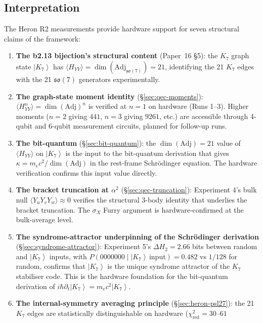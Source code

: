 \documentclass[11pt]{article}
\newcommand{\so}{\mathfrak{so}}
\newcommand{\Adj}{\mathrm{Adj}}
\newcommand{\ket}[1]{\left|#1\right\rangle}
\begin{document}
\subsection{Interpretation}
\label{sec:heron-interpretation}

The Heron R2 measurements provide hardware support for seven
structural claims of the framework:

\begin{enumerate}
\item \textbf{The b2.13 bijection's structural content}
  (Paper~16 \S5):  the $K_7$ graph state $\ket{K_7}$ has
  $\langle H_{YY}\rangle = \dim(\Adj_{\so(7)}) = 21$, identifying
  the 21 $K_7$ edges with the 21 $\so(7)$ generators experimentally.
\item \textbf{The graph-state moment identity}
  (\S\ref{sec:qec-moments}):  $\langle H_{YY}^n\rangle = \dim(\Adj)^n$
  is verified at $n=1$ on hardware (Runs 1--3).  Higher moments
  ($n=2$ giving $441$, $n=3$ giving $9261$, etc.) are accessible
  through 4-qubit and 6-qubit measurement circuits, planned for
  follow-up runs.
\item \textbf{The bit-quantum} (\S\ref{sec:bit-quantum}):  the
  $\dim(\Adj) = 21$ value of $\langle H_{YY}\rangle$ on $\ket{K_7}$
  is the input to the bit-quantum derivation that gives
  $\kappa = m_e c^2/\dim(\Adj)$ in the rest-frame Schr\"odinger
  equation.  The hardware verification confirms this input value
  directly.
\item \textbf{The bracket truncation at $\alpha^2$}
  (\S\ref{sec:qec-truncation}):  Experiment 4's bulk null
  $\langle Y_uY_vY_w\rangle \approx 0$ verifies the structural
  3-body identity that underlies the bracket truncation.  The
  $\sigma_X$ Furry argument is hardware-confirmed at the
  bulk-average level.
\item \textbf{The syndrome-attractor underpinning of the
  Schr\"odinger derivation}
  (\S\ref{sec:syndrome-attractor}):  Experiment 5's
  $\Delta H_2 = 2.66$ bits between random and $\ket{K_7}$ inputs,
  with $P(0000000 \mid \ket{K_7}\,\text{input}) = 0.482$ vs
  $1/128$ for random, confirms that $\ket{K_7}$ is the unique
  syndrome attractor of the $K_7$ stabiliser code.  This is the
  hardware foundation for the bit-quantum derivation of
  $i\hbar \partial_t \ket{K_7} = m_e c^2 \ket{K_7}$.
\item \textbf{The internal-symmetry averaging principle}
  (\S\ref{sec:heron-psl27}):  the 21 $K_7$ edges are statistically
  distinguishable on hardware ($\chi^2_{\text{red}} = 30$--$61$

\end{enumerate}
\end{document}
